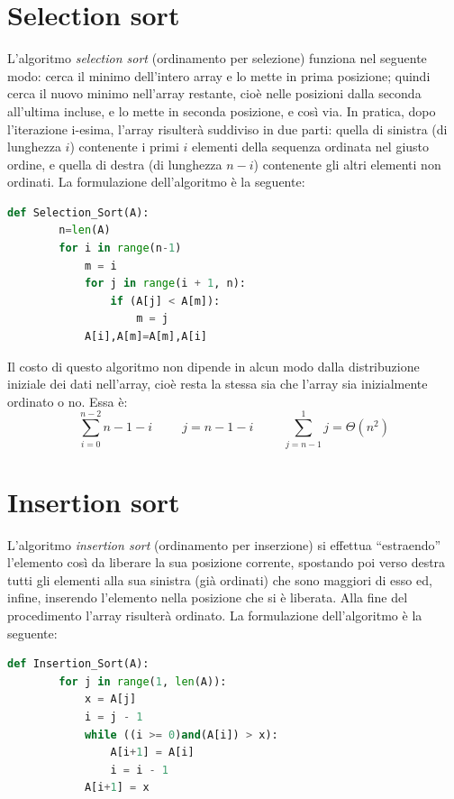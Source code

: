\section{Selection sort}
L’algoritmo \textit{selection sort} (ordinamento per selezione) funziona nel seguente modo: cerca il minimo dell'intero array e lo mette in prima posizione; quindi cerca il nuovo minimo nell'array restante, cioè nelle posizioni dalla seconda all'ultima incluse, e lo mette in seconda posizione, e così via. In pratica, dopo l’iterazione i-esima, l’array risulterà suddiviso in due parti: quella di sinistra (di lunghezza $i$) contenente i primi $i$ elementi della sequenza ordinata nel giusto ordine, e quella di destra (di lunghezza $n-i$) contenente gli altri elementi non ordinati.
La formulazione dell'algoritmo è la seguente:
\begin{lstlisting}[language=Python]
    def Selection_Sort(A):
        n=len(A)
        for i in range(n-1)
            m = i
            for j in range(i + 1, n):
                if (A[j] < A[m]):
                    m = j
            A[i],A[m]=A[m],A[i]
\end{lstlisting}
Il costo di questo algoritmo non dipende in alcun modo dalla distribuzione iniziale dei dati nell'array, cioè resta la stessa sia che l’array sia  inizialmente ordinato o no. Essa è:\begin{equation*}\sum^{n-2}_{i=0}n-1-i\hspace{1cm}j=n-1-i\hspace{1cm}\sum^{1}_{j=n-1}j=\Theta(n^2)\end{equation*}


\section{Insertion sort}
L’algoritmo \textit{insertion sort} (ordinamento per inserzione) si effettua “estraendo” l’elemento così da liberare la sua posizione corrente, spostando poi verso destra tutti gli elementi alla sua sinistra (già ordinati) che sono maggiori di esso ed, infine, inserendo l’elemento nella posizione che si è liberata. Alla fine del procedimento l’array risulterà ordinato. La formulazione dell'algoritmo è la seguente:
\begin{lstlisting}[language=Python]
    def Insertion_Sort(A):
        for j in range(1, len(A)):
            x = A[j]
            i = j - 1
            while ((i >= 0)and(A[i]) > x):
                A[i+1] = A[i]
                i = i - 1
            A[i+1] = x
\end{lstlisting}

